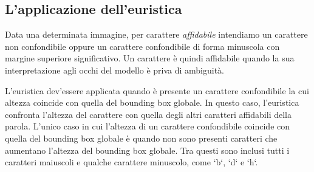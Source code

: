 \subsection{L'applicazione dell'euristica}

Data una determinata immagine, per carattere \emph{affidabile} intendiamo un carattere non confondibile oppure un carattere confondibile di forma minuscola con margine superiore significativo. Un carattere è quindi affidabile quando la sua interpretazione agli occhi del modello è priva di ambiguità.

L'euristica dev'essere applicata quando è presente un carattere confondibile la cui altezza coincide con quella del bounding box globale. In questo caso, l'euristica confronta l'altezza del carattere con quella degli altri caratteri affidabili della parola.
L'unico caso in cui l'altezza di un carattere confondibile coincide con quella del bounding box globale è quando non sono presenti caratteri che aumentano l'altezza del bounding box globale. Tra questi sono inclusi tutti i caratteri maiuscoli e qualche carattere minuscolo, come `b`, `d` e `h`.
